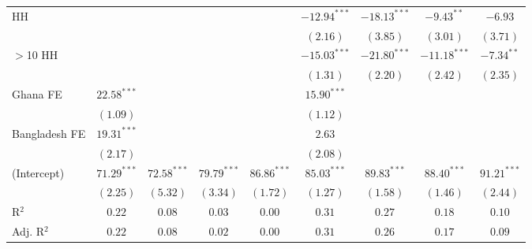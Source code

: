 \begin{threeparttable}
\begin{tabular}{l@{} c@{} c@{} c@{} c@{} c@{} c@{} c@{} c@{}}
\quad 10 HH                                    &                &                &               &               & $-12.94^{***}$ & $-18.13^{***}$ & $-9.43^{**}$   & $-6.93$        \\
                                               &                &                &               &               & $(2.16)$       & $(3.85)$       & $(3.01)$       & $(3.71)$       \\
\quad $>$10 HH                                 &                &                &               &               & $-15.03^{***}$ & $-21.80^{***}$ & $-11.18^{***}$ & $-7.34^{**}$   \\
                                               &                &                &               &               & $(1.31)$       & $(2.20)$       & $(2.42)$       & $(2.35)$       \\
Ghana FE                                       & $22.58^{***}$  &                &               &               & $15.90^{***}$  &                &                &                \\
                                               & $(1.09)$       &                &               &               & $(1.12)$       &                &                &                \\
Bangladesh FE                                  & $19.31^{***}$  &                &               &               & $2.63$         &                &                &                \\
                                               & $(2.17)$       &                &               &               & $(2.08)$       &                &                &                \\
(Intercept)                                    & $71.29^{***}$  & $72.58^{***}$  & $79.79^{***}$ & $86.86^{***}$ & $85.03^{***}$  & $89.83^{***}$  & $88.40^{***}$  & $91.21^{***}$  \\
                                               & $(2.25)$       & $(5.32)$       & $(3.34)$      & $(1.72)$      & $(1.27)$       & $(1.58)$       & $(1.46)$       & $(2.44)$       \\
\midrule
R$^2$                                          & $0.22$         & $0.08$         & $0.03$        & $0.00$        & $0.31$         & $0.27$         & $0.18$         & $0.10$         \\
Adj. R$^2$                                     & $0.22$         & $0.08$         & $0.02$        & $0.00$        & $0.31$         & $0.26$         & $0.17$         & $0.09$         \\

\end{tabular}
\end{threeparttable}
